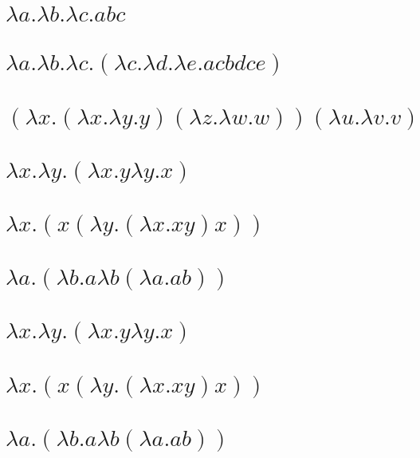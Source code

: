 \documentclass[answers]{exam}
\begin{document}
\begin{questions}
\begin{solution}
\begin{parts}
      \part{$\lambda a.\lambda b.\lambda c.abc$}
      \part{$\lambda a.\lambda b.\lambda c.(\lambda c.\lambda d.\lambda e.acbdce)$}
      \part{$(\lambda x.(\lambda x.\lambda y.y) (\lambda z.\lambda w.w)) (\lambda u.\lambda v.v)$}
    \end{parts}
  \end{solution}

    \begin{parts}
      \part{$\lambda x.\lambda y.(\lambda x.y \lambda y.x)$}
      \part{$\lambda x.(x (\lambda y.(\lambda x.x y) x))$}
      \part{$\lambda a.(\lambda b.a \lambda b (\lambda a.a b))$}
    \end{parts}
    \begin{solution}
      \begin{parts}
        \part{$\lambda x.\lambda y.(\lambda x.y \lambda y.x)$}
        \part{$\lambda x.(x (\lambda y.(\lambda x.x y) x))$}
        \part{$\lambda a.(\lambda b.a \lambda b (\lambda a.a b))$}
    \end{parts}
    \end{solution}
\end{questions}
\end{document}
